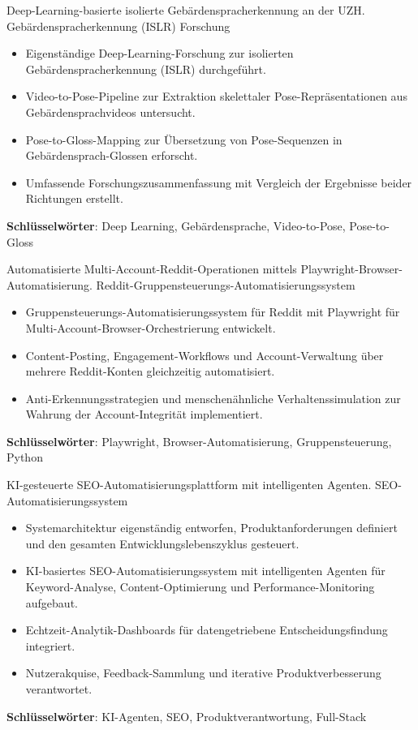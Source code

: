\documentclass[a4paper, serif, 10pt]{moderncv}
\begin{document}
        {Deep-Learning-basierte isolierte Gebärdenspracherkennung an der UZH.}
        {Gebärdenspracherkennung (ISLR) Forschung}
        {}
        {}
        {\begin{itemize}
\item Eigenständige Deep-Learning-Forschung zur isolierten Gebärdenspracherkennung (ISLR) durchgeführt.
\item Video-to-Pose-Pipeline zur Extraktion skelettaler Pose-Repräsentationen aus Gebärdensprachvideos untersucht.
\item Pose-to-Gloss-Mapping zur Übersetzung von Pose-Sequenzen in Gebärdensprach-Glossen erforscht.
\item Umfassende Forschungszusammenfassung mit Vergleich der Ergebnisse beider Richtungen erstellt.
\end{itemize}
\textbf{Schlüsselwörter}: Deep Learning, Gebärdensprache, Video-to-Pose, Pose-to-Gloss}

        {Automatisierte Multi-Account-Reddit-Operationen mittels Playwright-Browser-Automatisierung.}
        {Reddit-Gruppensteuerungs-Automatisierungssystem}
        {}
        {}
        {\begin{itemize}
\item Gruppensteuerungs-Automatisierungssystem für Reddit mit Playwright für Multi-Account-Browser-Orchestrierung entwickelt.
\item Content-Posting, Engagement-Workflows und Account-Verwaltung über mehrere Reddit-Konten gleichzeitig automatisiert.
\item Anti-Erkennungsstrategien und menschenähnliche Verhaltenssimulation zur Wahrung der Account-Integrität implementiert.
\end{itemize}
\textbf{Schlüsselwörter}: Playwright, Browser-Automatisierung, Gruppensteuerung, Python}

        {KI-gesteuerte SEO-Automatisierungsplattform mit intelligenten Agenten.}
        {SEO-Automatisierungssystem}
        {}
        {}
        {\begin{itemize}
\item Systemarchitektur eigenständig entworfen, Produktanforderungen definiert und den gesamten Entwicklungslebenszyklus gesteuert.
\item KI-basiertes SEO-Automatisierungssystem mit intelligenten Agenten für Keyword-Analyse, Content-Optimierung und Performance-Monitoring aufgebaut.
\item Echtzeit-Analytik-Dashboards für datengetriebene Entscheidungsfindung integriert.
\item Nutzerakquise, Feedback-Sammlung und iterative Produktverbesserung verantwortet.
\end{itemize}
\textbf{Schlüsselwörter}: KI-Agenten, SEO, Produktverantwortung, Full-Stack}
\end{document}

